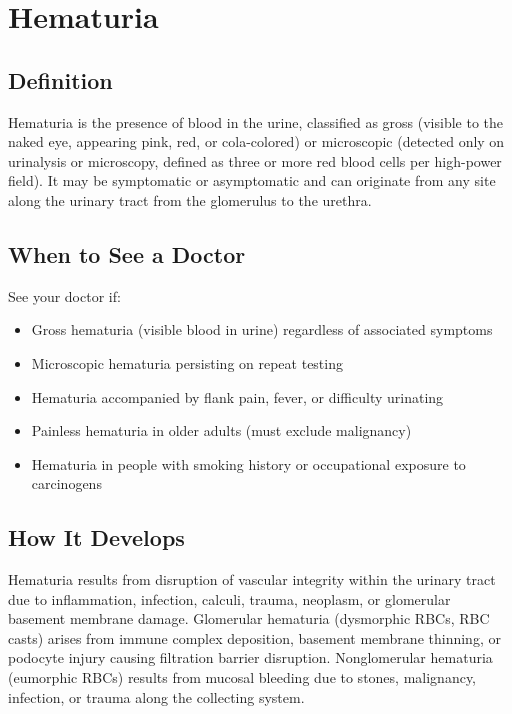 \chapter{Hematuria}

\section*{Definition}
Hematuria is the presence of blood in the urine, classified as gross (visible to the naked eye, appearing pink, red, or cola-colored) or microscopic (detected only on urinalysis or microscopy, defined as three or more red blood cells per high-power field). It may be symptomatic or asymptomatic and can originate from any site along the urinary tract from the glomerulus to the urethra.

\section*{When to See a Doctor}
See your doctor if:
\begin{itemize}
  \item Gross hematuria (visible blood in urine) regardless of associated symptoms
  \item Microscopic hematuria persisting on repeat testing
  \item Hematuria accompanied by flank pain, fever, or difficulty urinating
  \item Painless hematuria in older adults (must exclude malignancy)
  \item Hematuria in people with smoking history or occupational exposure to carcinogens
\end{itemize}

\section*{How It Develops}
Hematuria results from disruption of vascular integrity within the urinary tract due to inflammation, infection, calculi, trauma, neoplasm, or glomerular basement membrane damage. Glomerular hematuria (dysmorphic RBCs, RBC casts) arises from immune complex deposition, basement membrane thinning, or podocyte injury causing filtration barrier disruption. Nonglomerular hematuria (eumorphic RBCs) results from mucosal bleeding due to stones, malignancy, infection, or trauma along the collecting system.

